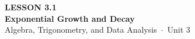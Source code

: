 \documentclass[aspectratio=169, 11pt]{beamer}
\begin{document}
{
\begin{frame}[plain]
  \vspace{2.8cm}\hspace{0.55cm}%
  \begin{minipage}{0.9\textwidth}
    {\color{goldacc}\bfseries\small LESSON 3.1}\\[0.5cm]
    {\color{white}\bfseries\LARGE Exponential Growth and Decay}\\[1.2cm]
    {\color{mistmid}\small Algebra, Trigonometry, and Data Analysis~$\cdot$~Unit 3}
  \end{minipage}
\end{frame}
}

\begin{frame}[t, plain]
\end{frame}
\end{document}
